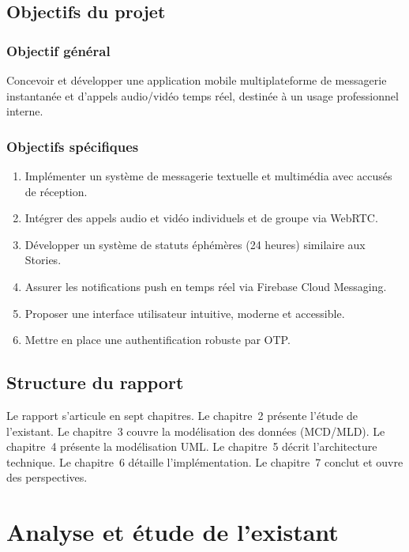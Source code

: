 \documentclass[12pt,a4paper]{report}
\begin{document}
\section{Objectifs du projet}

\subsection{Objectif général}
Concevoir et développer une application mobile multiplateforme de messagerie instantanée et d'appels audio/vidéo temps réel, destinée à un usage professionnel interne.

\subsection{Objectifs spécifiques}
\begin{enumerate}[leftmargin=1.5cm]
  \item Implémenter un système de messagerie textuelle et multimédia avec accusés de réception.
  \item Intégrer des appels audio et vidéo individuels et de groupe via WebRTC.
  \item Développer un système de statuts éphémères (24 heures) similaire aux Stories.
  \item Assurer les notifications push en temps réel via Firebase Cloud Messaging.
  \item Proposer une interface utilisateur intuitive, moderne et accessible.
  \item Mettre en place une authentification robuste par OTP.
\end{enumerate}

\section{Structure du rapport}

Le rapport s'articule en sept chapitres. Le chapitre~2 présente l'étude de l'existant. Le chapitre~3 couvre la modélisation des données (MCD/MLD). Le chapitre~4 présente la modélisation UML. Le chapitre~5 décrit l'architecture technique. Le chapitre~6 détaille l'implémentation. Le chapitre~7 conclut et ouvre des perspectives.

\chapter{Analyse et étude de l'existant}
\end{document}
